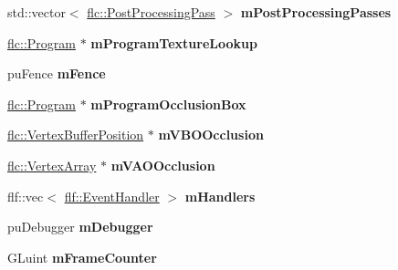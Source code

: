 \begin{DoxyCompactItemize}
std\+::vector$<$ \hyperlink{classflw_1_1flc_1_1PostProcessingPass}{flc\+::\+Post\+Processing\+Pass} $>$ {\bfseries m\+Post\+Processing\+Passes}
\item 
\mbox{\label{structflw_1_1Engine_1_1EngineImpl_a7fd86a72c8c44afcb8906ef16acb9203}} 
\hyperlink{classflw_1_1flc_1_1Program}{flc\+::\+Program} $\ast$ {\bfseries m\+Program\+Texture\+Lookup}
\item 
\mbox{\label{structflw_1_1Engine_1_1EngineImpl_ad7e5571888988906b05acc66cc882db2}} 
pu\+Fence {\bfseries m\+Fence}
\item 
\mbox{\label{structflw_1_1Engine_1_1EngineImpl_a89ed97e3c49f24dad22d9bdc9c9433ce}} 
\hyperlink{classflw_1_1flc_1_1Program}{flc\+::\+Program} $\ast$ {\bfseries m\+Program\+Occlusion\+Box}
\item 
\mbox{\label{structflw_1_1Engine_1_1EngineImpl_a9bd419c639d5401878c52c25b18b3df0}} 
\hyperlink{classflw_1_1flc_1_1VertexBufferPosition}{flc\+::\+Vertex\+Buffer\+Position} $\ast$ {\bfseries m\+V\+B\+O\+Occlusion}
\item 
\mbox{\label{structflw_1_1Engine_1_1EngineImpl_a1f7b14725bc12003f7598f54d6e9ed65}} 
\hyperlink{classflw_1_1flc_1_1VertexArray}{flc\+::\+Vertex\+Array} $\ast$ {\bfseries m\+V\+A\+O\+Occlusion}
\item 
\mbox{\label{structflw_1_1Engine_1_1EngineImpl_a1cd869b6b0848618da10965c43e85058}} 
flf\+::vec$<$ \hyperlink{classflw_1_1flf_1_1EventHandler}{flf\+::\+Event\+Handler} $>$ {\bfseries m\+Handlers}
\item 
\mbox{\label{structflw_1_1Engine_1_1EngineImpl_af821555a9e1ba1352c6c9af5ba53c25d}} 
pu\+Debugger {\bfseries m\+Debugger}
\item 
\mbox{\label{structflw_1_1Engine_1_1EngineImpl_a9c92e97d68999058251d34739f0f8d61}} 
G\+Luint {\bfseries m\+Frame\+Counter}
\item 
\mbox{\label{structflw_1_1Engine_1_1EngineImpl_aa7597dc69e422afb55320a96721cd373}} 

\end{DoxyCompactItemize}
